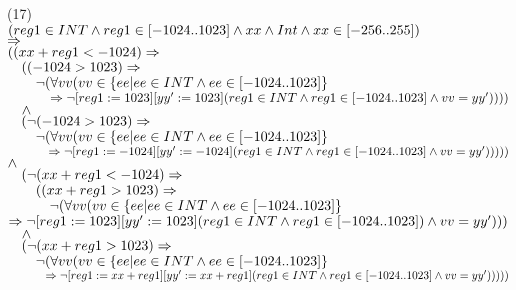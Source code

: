 \bigskip\noindent
(17)\\
$(reg1\in INT\et reg1\in[-1024..1023]\et xx\et Int\et xx\in[-256..255])$\\
$\fleche$\\
$(({xx+reg1} < -1024)\fleche$\\
$\tab{1em}((-1024 > 1023)\fleche$\\
$\tab{2em}\neg(\forall vv (vv\in \{ ee | ee\in INT \et ee\in [-1024..1023] \}$\\
$\tab{3em}\fleche\neg[reg1:=1023][yy' := 1023](reg1\in INT\et reg1\in[-1024..1023]\et vv = yy'))))$
$\tab{1em}\et$\\
$\tab{1em}(\neg(-1024 > 1023)\fleche$\\
$\tab{2em}\neg(\forall vv (vv\in \{ ee | ee\in INT \et ee\in [-1024..1023] \}$\\
$\tab{3em}\fleche\neg[reg1:=-1024][yy' := -1024](reg1\in INT\et reg1\in[-1024..1023]\et vv = yy')))))$
$\et$\\
$\tab{1em}(\neg({xx+reg1} < -1024)\fleche$\\
$\tab{2em}(( {xx+reg1} > 1023)\fleche$\\
$\tab{3em}\neg(\forall vv (vv\in \{ ee | ee\in INT \et ee\in [-1024..1023] \}$\\
$\fleche\neg[reg1:=1023][yy' := 1023](reg1\in INT\et reg1\in[-1024..1023])\et vv = yy')))$
$\tab{1em}\et$\\
$\tab{1em}(\neg( {xx+reg1} > 1023)\fleche$\\
$\tab{2em}\neg(\forall vv (vv\in \{ ee | ee\in INT \et ee\in [-1024..1023] \}$\\
$\tab{3em}\fleche\neg[reg1 := {xx+reg1}][yy' := {xx+reg1}](reg1\in INT\et reg1\in[-1024..1023]\et vv = yy')))))$

